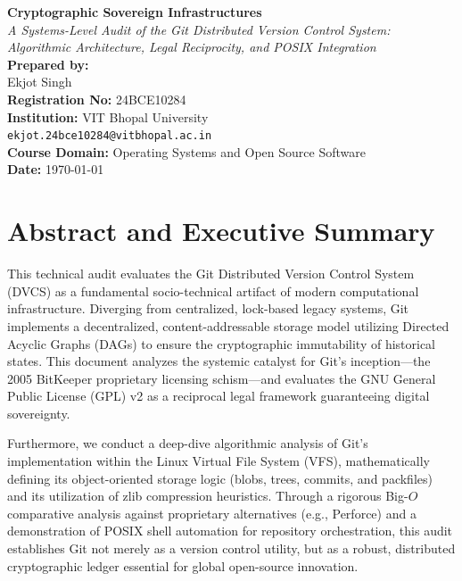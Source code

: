 \documentclass[11pt, a4paper]{article}
\begin{document}
\begin{titlepage}
    \centering
    \vspace*{3cm}
    \Huge \textbf{Cryptographic Sovereign Infrastructures} \\
    \vspace{0.7cm}
    \Large \textit{A Systems-Level Audit of the Git Distributed Version Control System: \\ Algorithmic Architecture, Legal Reciprocity, and POSIX Integration} \\
    \vfill
    \large
    \textbf{Prepared by:} \\
    Ekjot Singh \\
    \textbf{Registration No:} 24BCE10284 \\
    \textbf{Institution:} VIT Bhopal University \\
    \texttt{ekjot.24bce10284@vitbhopal.ac.in} \\
    \vspace{1cm}
    \textbf{Course Domain:} Operating Systems and Open Source Software \\
    \vfill
    \textbf{Date:} \today
\end{titlepage}

\newpage
\section*{Abstract and Executive Summary}
This technical audit evaluates the Git Distributed Version Control System (DVCS) as a fundamental socio-technical artifact of modern computational infrastructure. Diverging from centralized, lock-based legacy systems, Git implements a decentralized, content-addressable storage model utilizing Directed Acyclic Graphs (DAGs) to ensure the cryptographic immutability of historical states. This document analyzes the systemic catalyst for Git's inception—the 2005 BitKeeper proprietary licensing schism—and evaluates the GNU General Public License (GPL) v2 as a reciprocal legal framework guaranteeing digital sovereignty. 

Furthermore, we conduct a deep-dive algorithmic analysis of Git's implementation within the Linux Virtual File System (VFS), mathematically defining its object-oriented storage logic (blobs, trees, commits, and packfiles) and its utilization of zlib compression heuristics. Through a rigorous Big-$O$ comparative analysis against proprietary alternatives (e.g., Perforce) and a demonstration of POSIX shell automation for repository orchestration, this audit establishes Git not merely as a version control utility, but as a robust, distributed cryptographic ledger essential for global open-source innovation.

\newpage
\tableofcontents
\newpage





\newpage

\end{document}
